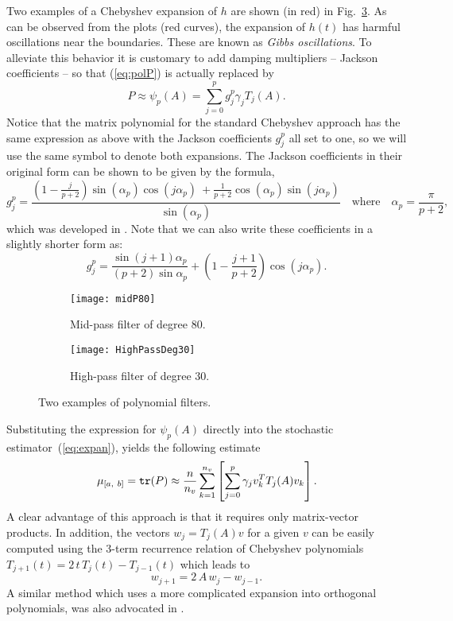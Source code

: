 \documentclass[12pt]{article}		\usepackage{tabls,multirow}
\def\trace{\mbox{\tt tr}}
\newcommand{\ab}{[a, \ b]}
\def\nref#1{(\ref{#1})}
\newcommand{\eq}[1]{\begin{equation}\label{#1}}
\newcommand{\en}{\end{equation}}
\begin{document}
Two  examples of a Chebyshev expansion of $h$ are shown (in red) in
Fig.~\ref{fig:midP}.  As can be observed from the plots (red curves),
the expansion of $h(t)$ has harmful oscillations near the
boundaries. These are known as \emph{Gibbs oscillations}. To alleviate
this behavior it is customary to add damping multipliers -- Jackson
coefficients -- so that \nref{eq:polP} is actually replaced by
\eq{eq:polPJ} 
P \approx \psi_p(A) = \sum_{j=0}^p g_j^{p} \gamma_j
T_j(A) .  
\en 
Notice that the matrix polynomial for the standard
Chebyshev approach has the same expression as above with
the Jackson coefficients $g_j^p$ all set to one, so we will use
the same symbol to denote both expansions.
The Jackson coefficients in their original form can be shown 
to be given by the formula,
\eq{eq:JacCoef} 
g_{j}^{p}=
\frac{ \left( 1 - \frac{j}{p+2} \right) \sin( \alpha_{p} ) \cos( j \alpha_{p} )\
 +
 \frac{1}{p+2} \cos( \alpha_{p} ) \sin( j \alpha_{p} ) }{ 
\sin( \alpha_{p} ) }
\quad \mbox{where}\quad
 \alpha_{p}=\frac{\pi}{p+2}
 , 
\en 
which was developed in \cite{Jay-al}. Note that we can also write these
coefficients in a slightly shorter form as:
\eq{eq:JacCoef1}
g_{j}^{p} = 
\frac{\sin(j+1)\alpha_p }{(p+2)\sin \alpha_p } + 
 \left(1 - \frac{j+1}{p+2} \right) \cos(j \alpha_{p} ) .
\en
\begin{figure}[htb]
\centering
  \begin{subfigure}[b]{0.48\textwidth}
                \centering
                \texttt{[image: midP80]}
                \caption{Mid-pass filter of degree $80$.}
                \label{fig:mid-pass}
  \end{subfigure}
  \begin{subfigure}[b]{0.48\textwidth}
                \centering
                \texttt{[image: HighPassDeg30]}
                \caption{High-pass filter of degree $30$.}
                \label{fig:high-pass}
  \end{subfigure}
\caption{Two examples of polynomial filters.} 
\label{fig:midP}
\end{figure} 

Substituting  the expression for $\psi_p(A)$ directly into the
stochastic estimator~(\ref{eq:expan}), yields the following estimate
\eq{eq:estP}  
\mu_{\ab} = \trace (P) \approx \frac{n}{n_v} \sum_{k=1}^{n_v} 
\left[
\sum_{j=0}^p \gamma_j v_k^T T_j(A) v_k \right]   
 . \en
A clear  advantage of this approach is that it requires only matrix-vector
products. In addition, the vectors $w_j = T_j(A)v$ for a given $v$ can be
easily computed using the 3-term recurrence relation of Chebyshev polynomials
$T_{j+1} (t) = 2\, t\, T_j(t) - T_{j-1} (t)$ which leads to 
\[ 
w_{j+1} = 2\, A\, w_j - w_{j-1}. 
\]
A similar method which uses a more complicated expansion into
orthogonal polynomials, was also advocated in \cite{saad-filt}.
\end{document}
